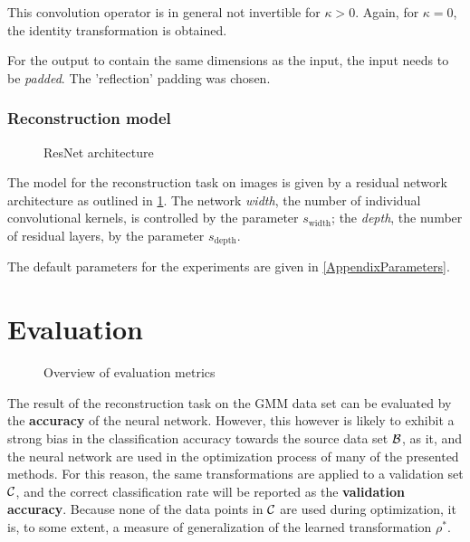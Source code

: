 This convolution operator is in general not invertible for $\kappa > 0$.
Again, for $\kappa = 0$, the identity transformation is obtained.

For the output to contain the same dimensions as the input, the input needs to be \textit{padded}.
The 'reflection' padding was chosen.


\subsubsection{Reconstruction model}

\begin{figure}
\begin{minipage}{0.5\textwidth}
\centering

\end{minipage}
\begin{minipage}{0.5\textwidth}
\centering

\end{minipage}
\caption{ResNet architecture}
\label{fig:resnet}
\end{figure}

The model for the reconstruction task on images is given by a residual network architecture
as outlined in \ref{fig:resnet}. 
The network \textit{width}, the number of individual convolutional kernels, is controlled by the parameter $s_\text{width}$; the \textit{depth}, the number of residual layers, by the parameter
$s_\text{depth}$.

The default parameters for the experiments are given in \ref{AppendixParameters}.




\section{Evaluation}
\label{sec:evaluation}

\begin{figure}[h]
    \centering
    
    \caption{Overview of evaluation metrics}
    \label{fig:inversion_outline}
    \centering
\end{figure}

The result of the reconstruction task on the GMM data set can be evaluated by the \textbf{accuracy}
of the neural network. However, this however is likely to exhibit a strong bias in the classification accuracy 
towards the source data set $\mathcal B$, as it, and 
the neural network 
are used in the optimization process
of many of the presented methods.
For this reason, the same transformations are applied to
a validation set $\mathcal C$, and the 
correct classification rate will be reported as the \textbf{validation accuracy}. 
Because none of the data points in $\mathcal C$
are used during optimization, it is, to some extent, a measure of generalization
of the learned transformation $\rho^*$.

